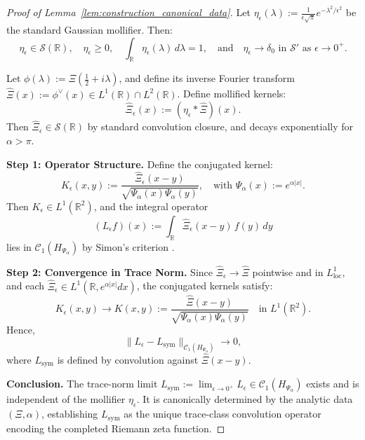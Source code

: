 \begin{proof}[Proof of Lemma~\ref{lem:construction_canonical_data}]
Let \( \eta_\epsilon(\lambda) := \frac{1}{\epsilon \sqrt{\pi}} e^{-\lambda^2 / \epsilon^2} \) be the standard Gaussian mollifier. Then:
\[
\eta_\epsilon \in \mathcal{S}(\mathbb{R}), \quad \eta_\epsilon \ge 0, \quad \int_{\mathbb{R}} \eta_\epsilon(\lambda)\, d\lambda = 1, \quad \text{and} \quad \eta_\epsilon \to \delta_0 \text{ in } \mathcal{S}' \text{ as } \epsilon \to 0^+.
\]

Let \( \phi(\lambda) := \Xi\left(\tfrac{1}{2} + i\lambda\right) \), and define its inverse Fourier transform \( \widehat{\Xi}(x) := \phi^\vee(x) \in L^1(\mathbb{R}) \cap L^2(\mathbb{R}) \). Define mollified kernels:
\[
\widehat{\Xi}_\epsilon(x) := (\eta_\epsilon * \widehat{\Xi})(x).
\]
Then \( \widehat{\Xi}_\epsilon \in \mathcal{S}(\mathbb{R}) \) by standard convolution closure, and decays exponentially for \( \alpha > \pi \).

\medskip
\noindent\textbf{Step 1: Operator Structure.}
Define the conjugated kernel:
\[
K_\epsilon(x,y) := \frac{\widehat{\Xi}_\epsilon(x - y)}{\sqrt{\Psi_\alpha(x)\Psi_\alpha(y)}}, \quad \text{with } \Psi_\alpha(x) := e^{\alpha |x|}.
\]
Then \( K_\epsilon \in L^1(\mathbb{R}^2) \), and the integral operator
\[
(L_\epsilon f)(x) := \int_{\mathbb{R}} \widehat{\Xi}_\epsilon(x - y)\, f(y)\, dy
\]
lies in \( \mathcal{C}_1(H_{\Psi_\alpha}) \) by Simon’s criterion \cite[Thm.~3.1]{Simon2005TraceIdeals}.

\medskip
\noindent\textbf{Step 2: Convergence in Trace Norm.}
Since \( \widehat{\Xi}_\epsilon \to \widehat{\Xi} \) pointwise and in \( L^1_{\mathrm{loc}} \), and each \( \widehat{\Xi}_\epsilon \in L^1(\mathbb{R}, e^{\alpha|x|} dx) \), the conjugated kernels satisfy:
\[
K_\epsilon(x,y) \to K(x,y) := \frac{\widehat{\Xi}(x - y)}{\sqrt{\Psi_\alpha(x)\Psi_\alpha(y)}} \quad \text{in } L^1(\mathbb{R}^2).
\]
Hence,
\[
\|L_\epsilon - L_{\mathrm{sym}}\|_{\mathcal{C}_1(H_{\Psi_\alpha})} \to 0,
\]
where \( L_{\mathrm{sym}} \) is defined by convolution against \( \widehat{\Xi}(x - y) \).

\medskip
\noindent\textbf{Conclusion.}
The trace-norm limit \( L_{\mathrm{sym}} := \lim_{\epsilon \to 0^+} L_\epsilon \in \mathcal{C}_1(H_{\Psi_\alpha}) \) exists and is independent of the mollifier \( \eta_\epsilon \). It is canonically determined by the analytic data \( (\Xi, \alpha) \), establishing \( L_{\mathrm{sym}} \) as the unique trace-class convolution operator encoding the completed Riemann zeta function.
\end{proof}
